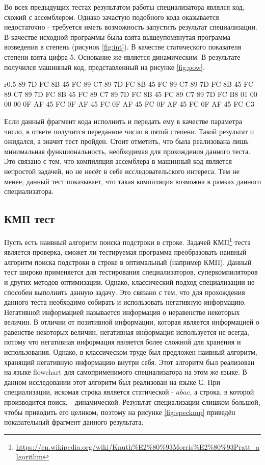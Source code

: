 \documentclass{spbau-diploma}
\begin{document}
Во всех предыдущих тестах результатом работы специализатора являлся код, схожий с ассемблером. Однако зачастую подобного кода оказывается недостаточно - требуется иметь возможность запустить результат специализации. В качестве исходной программы была взята вышеупомянутая программа возведения в степень (рисунок \ref{fig:int}). В качестве статического показателя степени взята цифра $5$. Основание же является динамическим. В результате получился машинный код, представленный на рисунке \ref{fig:pow}.
\begin{wrapfigure}{r}{0.5\textwidth}
89 7D FC 8B 45 FC 89 C7 89 7D FC 8B 45 FC 89 C7 89 7D FC 8B 45 FC 89 C7 89 7D FC 8B 45 FC 89 C7 89 7D FC 8B 45 FC 89 C7 89 7D FC B8 01 00 00 00 0F AF 45 FC 0F AF 45 FC 0F AF 45 FC 0F AF 45 FC 0F AF 45 FC C3
\caption{ Сумма двух чисел}
\label{fig:pow}
\end{wrapfigure}
Если данный фрагмент кода исполнить и передать ему в качестве параметра число, в ответе получится переданное число в пятой степени. Такой результат и ожидался, а значит тест пройден. Стоит отметить, что была реализована лишь минимальная функциональность, необходимая для прохождения данного теста. Это связано с тем, что компиляция ассемблера в машинный код является непростой задачей, но не несёт в себе исследовательского интереса. Тем не менее, данный тест показывает, что такая компиляция возможна в рамках данного специализатора.

\subsection{ КМП тест}
Пусть есть наивный алгоритм поиска подстроки в строке. Задачей КМП\footnote{\url{https://en.wikipedia.org/wiki/Knuth\%E2\%80\%93Morris\%E2\%80\%93Pratt\_algorithm}} теста является проверка, сможет ли тестируемая программа преобразовать наивный алгоритм поиска подстроки в строке в оптимальный (например КМП). Данный тест широко применяется для тестирования специализаторов, суперкомпиляторов и других методов оптимизации. Однако, классический подход специализации не способен выполнить данную задачу. Это связано с тем, что для прохождения данного теста необходимо собирать и использовать негативную информацию. Негативной информацией называется информация о неравенстве некоторых величин. В отличии от позитивной информации, которая является информацией о равенстве некоторых величин, негативная информация используется не всегда, потому что негативная информация является более сложной для хранения и использования. Однако, в классическом труде \cite{PEAPG} был предложен наивный алгоритм, хранящий негативную информацию внутри себя. Этот алгоритм был реализован на языке flowchart для самоприменимого специализатора на этом же языке. В данном исследовании этот алгоритм был реализован на языке С.  При специализации, искомая строка является статической - $abac$, а строка, в которой производится поиск, - динамической. Результат специализации слишком большой, чтобы приводить его целиком, поэтому на рисунке \ref{fig:speckmp} приведён показательный фрагмент данного результата. 
\end{document}
